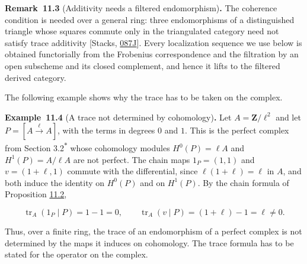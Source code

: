 \documentclass[11pt]{article}
\newenvironment{bpstatement}[2]{\par\addvspace{0.6\baselineskip}\noindent\textbf{#1}#2\textbf{.}\enspace\ignorespaces}
  {\par\addvspace{0.4\baselineskip}}
\newcommand{\bpout}[1]{#1\textsuperscript{\hyperlink{bp-outside}{\ensuremath{\ast}}}}
\begin{document}
\label{bp179}%
\begin{bpstatement}{Remark~11.3}{ (Additivity needs a filtered endomorphism)}
The coherence condition is needed over a general ring: three endomorphisms of a distinguished triangle whose squares commute only in the triangulated category need not satisfy trace additivity [Stacks, \href{https://stacks.math.columbia.edu/tag/087J}{087J}]. Every localization sequence we use below is obtained functorially from the Frobenius correspondence and the filtration by an open subscheme and its closed complement, and hence it lifts to the filtered derived category.
\end{bpstatement}

\label{bp180}%
The following example shows why the trace has to be taken on the complex.

\label{bp181}%
\begin{bpstatement}{Example~11.4}{ (A trace not determined by cohomology)}
Let \(A=\mathbf Z/\ell^2\) and let \(P=[A\xrightarrow{\ell}A]\), with the terms in degrees \(0\) and \(1\). This is the perfect complex from Section \bpout{3.2} whose cohomology modules \(H^0(P)=\ell A\) and \(H^1(P)=A/\ell A\) are not perfect. The chain maps \(1_P=(1,1)\) and \(v=(1+\ell,1)\) commute with the differential, since \(\ell(1+\ell)=\ell\) in \(A\), and both induce the identity on \(H^0(P)\) and on \(H^1(P)\). By the chain formula of Proposition \hyperref[bp176]{11.2},

\[
\operatorname{tr}_A(1_P\mid P)=1-1=0,
\qquad
\operatorname{tr}_A(v\mid P)=(1+\ell)-1=\ell\neq0.
\]

Thus, over a finite ring, the trace of an endomorphism of a perfect complex is not determined by the maps it induces on cohomology. The trace formula has to be stated for the operator on the complex.
\end{bpstatement}


\end{document}
